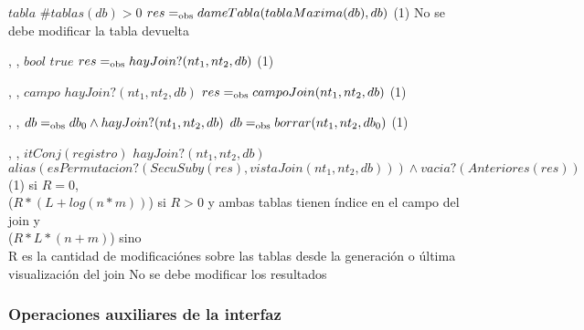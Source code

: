 {   }
{$tabla$}
{$\#tablas(db) > 0$}
{$res =_{\mathrm{obs}} dameTabla(tablaMaxima(db),db)$}
{\bigo(1)}
{No se debe modificar la tabla devuelta}
{}

{   ,
    ,
    }
{$bool$}
{$true$}
{$res =_{\mathrm{obs}} hayJoin?(nt_1,nt_2,db)$}
{\bigo(1)}
{}
{}

{   ,
    ,
    }
{$campo$}
{$hayJoin?(nt_1,nt_2,db)$}
{$res =_{\mathrm{obs}} campoJoin(nt_1,nt_2,db)$}
{\bigo(1)}
{}
{}

{   ,
    ,
    }
{}
{$db =_{\mathrm{obs}} db_0 \land hayJoin?(nt_1,nt_2,db)$}
{$db =_{\mathrm{obs}} borrar(nt_1,nt_2,db_0)$}
{\bigo(1)}
{}
{}

{   ,
    ,
    }
{$itConj(registro)$}
{$hayJoin?(nt_1,nt_2,db)$}
{$alias(esPermutacion?(SecuSuby(res), vistaJoin(nt_1, nt_2, db))) \land vacia?(Anteriores(res))$}
{\bigo(1) si $R = 0$, \\
    \hspace*{4em} \bigo($R * (L + log(n * m))$) si $R > 0$ y ambas tablas tienen índice en el campo del join y \\
    \hspace*{4em} \bigo($R * L * (n + m)$) sino \\
    \hspace*{4em} R es la cantidad de modificaciónes sobre las tablas desde la generación o última visualización del join}
{No se debe modificar los resultados}
{}

\subsubsection{Operaciones auxiliares de la interfaz}




